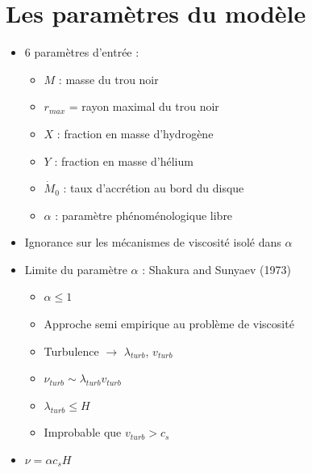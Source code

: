 \documentclass[french]{beamer}
\begin{document}
\section{Les paramètres du modèle}
\begin{frame}
\begin{itemize}
	\item 6 paramètres d'entrée :
	\begin{itemize}
		\item $M$ : masse du trou noir
		\item $r_{max}$ = rayon maximal du trou noir
		\item $X$ : fraction en masse d'hydrogène
		\item $Y$ : fraction en masse d'hélium
		\item $\dot{M}_{0}$ : taux d'accrétion au bord du disque
		\item $\alpha$ : paramètre phénoménologique libre 
	\end{itemize}
\end{itemize}
\end{frame} 

\begin{frame}
	\begin{itemize}
		\item Ignorance sur les mécanismes de viscosité isolé dans 					$\alpha$ \\
		
		\item Limite du paramètre $\alpha$ : Shakura and Sunyaev (1973)
			\begin{itemize}
				\item $\alpha \le 1$
				\item Approche semi empirique au problème de viscosité
				\item Turbulence $\rightarrow$ $\lambda_{turb}$, 							$v_{turb}$
				\item $\nu_{turb} \sim \lambda_{turb} v_{turb}$
				\item $\lambda_{turb} \le H$
				\item Improbable que $v_{turb} > c_{s}$
			\end{itemize}
		\item $\nu = \alpha c_{s} H$
	\end{itemize}
\end{frame}
\end{document}
